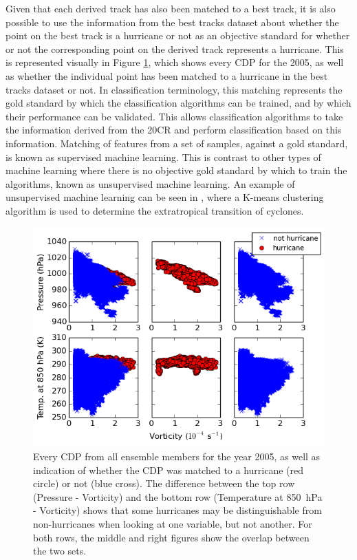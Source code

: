 \documentclass[pdftex,12pt,a4paper]{report}
\begin{document}
Given that each derived track has also been matched to a best track, it is also possible to use the
information from the best tracks dataset about whether the point on the best track is a hurricane or
not as an objective standard for whether or not the corresponding point on the derived track
represents a hurricane. This is represented visually in Figure \ref{fig:cdp_2005_with_hurrs}, which
shows every CDP for the 2005, as well as whether the individual point has been matched to a
hurricane in the best tracks dataset or not. In classification terminology, this matching represents
the gold standard by which the classification algorithms can be trained, and by which their
performance can be validated. This allows classification algorithms to take the information derived
from the 20CR and perform classification based on this information. Matching of features from a set
of samples, against a gold standard, is known as supervised machine learning. This is contrast to
other types of machine learning where there is no objective gold standard by which to train the
algorithms, known as unsupervised machine learning. An example of unsupervised machine learning can
be seen in \textcite{studholme2014objective}, where a K-means clustering algorithm is used to
determine the extratropical transition of cyclones.

\begin{figure}[hb!]
    \centering
    \includegraphics[width=\textwidth]{figures/cdp_2005_with_hurrs}
    \vspace{-10pt}
    \caption{Every CDP from all ensemble members for the year 2005, as well as indication of whether
        the CDP was matched to a hurricane (red circle) or not (blue cross). The difference between
        the top row (Pressure - Vorticity) and the bottom row (Temperature at \SI{850}{hPa} -
        Vorticity) shows that some hurricanes may be distinguishable from non-hurricanes when
        looking at one variable, but not another. For both rows, the middle and right figures show the
        overlap between the two sets.}
    \label{fig:cdp_2005_with_hurrs}
\end{figure}
\end{document}
